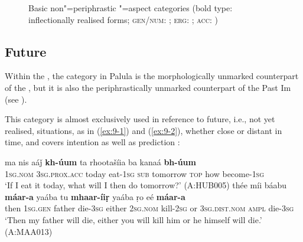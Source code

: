 \begin{figure}[ht]
\centering
{}
\caption{Basic non"=periphrastic "=aspect categories (bold type: inflectionally realised forms;
    \textsc{gen/num}: ; \textsc{erg}: ; \textsc{acc}:
     )}
\label{fig:9-1}
\end{figure}

\subsection{Future}
\label{subsec:9-1-2}

\largerpage
Within the , the  category in Palula is the morphologically unmarked counterpart of the , but it is also the periphrastically unmarked counterpart of the Past Im (see ). 



This category is almost exclusively used in reference to future, i.e., not yet realised, situations, as in (\ref{ex:9-1}) and (\ref{ex:9-2}), whether close or distant in time, and covers intention as well as prediction \citep[105--108]{dahl1985}:


\ea
\label{ex:9-1}
\gll ma nis aáǰ \textbf{kh-úum} ta rhootašíia ba kanaá \textbf{bh-úum}\\
\textsc{1sg.nom} \textsc{3}\textsc{sg.prox.acc} today eat-\textsc{1sg} \textsc{sub} tomorrow \textsc{top} how become-\textsc{1sg}\\
\glt `If I eat it today, what will I then do tomorrow?' (A:HUB005)
\ex
\label{ex:9-2}
\gll thée míi báabu \textbf{máar-a} yaába tu \textbf{mhaar-íiṛ} yaába ṛo eé \textbf{máar-a} \\
then \textsc{1sg.gen} father die-\textsc{3sg} either \textsc{2sg.nom} kill-\textsc{2sg}  or \textsc{3sg.dist.nom} \textsc{ampl} die-\textsc{3sg}  \\
\glt `Then my father will die, either you will kill him or he himself will die.' (A:MAA013)
\z

